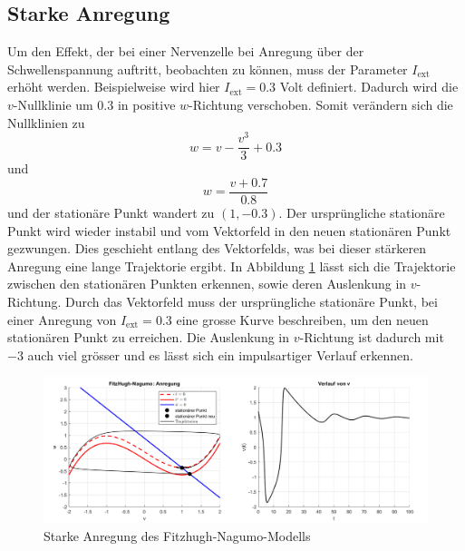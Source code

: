 \subsection{Starke Anregung}
Um den Effekt, der bei einer Nervenzelle bei Anregung über der Schwellenspannung auftritt, beobachten zu können, muss
der Parameter $I_\text{ext}$ erhöht werden.
Beispielweise wird hier $I_\text{ext} = 0.3$ Volt definiert.
Dadurch wird die $v$-Nullklinie um 0.3 in positive $w$-Richtung verschoben.
Somit verändern sich die Nullklinien zu 
\[ w = v - \frac{v^3}{3} + 0.3\]
und \[w = \frac{v + 0.7}{0.8}\] und der stationäre Punkt wandert zu $(1 ,-0.3)$.
Der ursprüngliche stationäre Punkt wird wieder instabil und vom Vektorfeld in den neuen stationären Punkt
gezwungen.
Dies geschieht entlang des Vektorfelds, was bei dieser stärkeren Anregung eine lange Trajektorie ergibt.
In Abbildung \ref{fig:starkeAnregung} lässt sich die Trajektorie zwischen den stationären Punkten erkennen, sowie
deren Auslenkung in $v$-Richtung.
Durch das Vektorfeld muss der ursprüngliche stationäre Punkt, bei einer Anregung von $I_\text{ext} = 0.3$ eine grosse Kurve
beschreiben, um den neuen stationären Punkt zu erreichen.
Die Auslenkung in $v$-Richtung ist dadurch mit $-3$ auch viel grösser und es lässt sich ein impulsartiger Verlauf erkennen.
\begin{figure}
    \centering
    \includegraphics[width=\textwidth]{papers/nerven/Bilder/starkeAnregung.png}
    \caption{Starke Anregung des Fitzhugh-Nagumo-Modells}
    \label{fig:starkeAnregung}
\end{figure}
